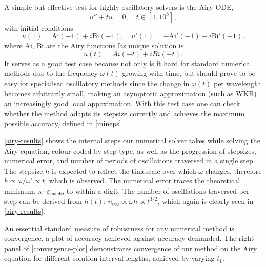 \documentclass[10pt]{article}
\newcommand{\be}{\begin{equation}}
\newcommand{\ee}{\end{equation}}
\newcommand{\om}{\omega}
\newcommand{\AB}[1]{{\color{orange}#1}}
\begin{document}
A simple but effective test for highly oscillatory solvers is the Airy ODE,
\be
u'' + tu = 0, \quad t \in [1, 10^8], 
\ee
with initial conditions
\be
u(1) = \text{Ai}(-1) + i\text{Bi}(-1), \quad u'(1) = - \text{Ai}'(-1) -i\text{Bi}'(-1).
\ee
where Ai, Bi are the Airy functions \cite[Chapter~9]{DLMFairy}
Its unique solution is
\be
u(t) = Ai(-t) + iBi(-t).
\ee
It serves as a good test case because not only is it hard
 for standard numerical methods due to the frequency $\om(t)$ growing with time, but should prove to
be easy for specialised oscillatory methods since the change in $\om(t)$ per wavelength becomes arbitrarily small, making an asymptotic approximation (such as WKB) 
an increasingly good local appoximation.
With this test
case one can check whether the method adapts its stepsize correctly and
achieves the maximum possible accuracy, defined in \cref{mineps}.


\cref{airy-results} shows the
internal steps our numerical solver takes while solving the Airy equation,
colour-coded by step type, as well as the progression of stepsizes, numerical
error, and number of periods of oscillations traversed in a single step. The
stepsize $h$ is expected to reflect the timescale over which $\om$ changes,
therefore $h \propto \om/\om' \propto t$, which is observed. The numerical
error traces the theoretical minimum, $\kappa \cdot \varepsilon_{\text{mach}}$, to
within a digit. The number of oscillations traversed per step can be derived
from $h(t)$: $n_{\text{osc}} \propto \om h \propto t^{3/2}$, which again is
clearly seen in \cref{airy-results}.

An essential standard measure of robustness for any numerical method is convergence, a plot of accuracy achieved against accuracy demanded. The right panel of \cref{convergence-plot} demonstrates convergence of our method on the Airy equation for different solution interval lengths, achieved by varying $t_1$.
\end{document}
